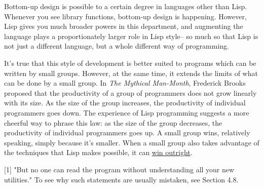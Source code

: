 Bottom-up design is possible to a certain degree in languages
other than Lisp.  Whenever you see library functions,
bottom-up design is happening.  However, Lisp gives you much broader
powers in this department, and augmenting the language plays a
proportionately larger role in Lisp style-- so much so that
Lisp is not just a different language, but a whole different way
of programming.

It's true that this style of development is better suited to
programs which can be written by small groups.  However, at the
same time, it extends the limits of what can be done by a small
group.  In \emph{The Mythical Man-Month},
Frederick Brooks
proposed that the productivity of a group of programmers
does not grow linearly with its size.  As the size of the
group increases, the productivity of individual programmers
goes down.  The experience of Lisp programming  
suggests a more cheerful way
to phrase this law: as the size of the group decreases, the
productivity of individual programmers goes up.
A small group wins, relatively speaking, simply because it's
smaller.  When a small group also takes advantage of the
techniques that Lisp makes possible, it can 
\href{http://www.paulgraham.com/avg.html}{win outright}.







[1] "But no one can read
the program without understanding all your new utilities."
To see why such statements are usually mistaken,
see Section 4.8.




